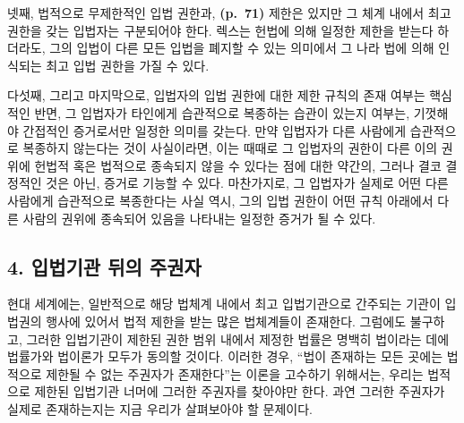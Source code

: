 넷째, 법적으로 무제한적인 입법 권한과, \textbf{(p.~71)} 제한은 있지만 그
체계 내에서 최고 권한을 갖는 입법자는 구분되어야 한다. 렉스는 헌법에
의해 일정한 제한을 받는다 하더라도, 그의 입법이 다른 모든 입법을 폐지할
수 있는 의미에서 그 나라 법에 의해 인식되는 최고 입법 권한을 가질 수
있다.

다섯째, 그리고 마지막으로, 입법자의 입법 권한에 대한 제한 규칙의 존재
여부는 핵심적인 반면, 그 입법자가 타인에게 습관적으로 복종하는 습관이
있는지 여부는, 기껏해야 간접적인 증거로서만 일정한 의미를 갖는다. 만약
입법자가 다른 사람에게 습관적으로 복종하지 않는다는 것이 사실이라면,
이는 때때로 그 입법자의 권한이 다른 이의 권위에 헌법적 혹은 법적으로
종속되지 않을 수 있다는 점에 대한 약간의, 그러나 결코 결정적인 것은
아닌, 증거로 기능할 수 있다. 마찬가지로, 그 입법자가 실제로 어떤 다른
사람에게 습관적으로 복종한다는 사실 역시, 그의 입법 권한이 어떤 규칙
아래에서 다른 사람의 권위에 종속되어 있음을 나타내는 일정한 증거가 될 수
있다.

\subsection{4. 입법기관 뒤의
주권자}\label{uxc785uxbc95uxae30uxad00-uxb4a4uxc758-uxc8fcuxad8cuxc790}

현대 세계에는, 일반적으로 해당 법체계 내에서 최고 입법기관으로 간주되는
기관이 입법권의 행사에 있어서 법적 제한을 받는 많은 법체계들이 존재한다.
그럼에도 불구하고, 그러한 입법기관이 제한된 권한 범위 내에서 제정한
법률은 명백히 법이라는 데에 법률가와 법이론가 모두가 동의할 것이다.
이러한 경우, ``법이 존재하는 모든 곳에는 법적으로 제한될 수 없는
주권자가 존재한다''는 이론을 고수하기 위해서는, 우리는 법적으로 제한된
입법기관 너머에 그러한 주권자를 찾아야만 한다. 과연 그러한 주권자가
실제로 존재하는지는 지금 우리가 살펴보아야 할 문제이다.

